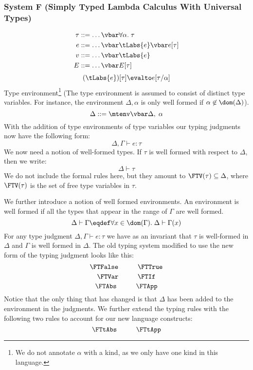 \subsubsection*{System F (Simply Typed Lambda Calculus With Universal Types)}
\begin{align*}
  \tau &::= \dots \vbar \forall \alpha. \; \tau \\
  e    &::= \dots \vbar \tLabs{e} \vbar e[\tau] \\
  v    &::= \dots \vbar \tLabs{e}\\
  E    &::= \dots \vbar E[\tau]
\end{align*}
\[
  (\tLabs{e})[\tau] \evalto e[\tau/\alpha]
\]
Type environment\footnote{We do not annotate $\alpha$ with a kind, as we only have one kind in this language.} (The type environment is assumed to consist of distinct type variables. For instance, the environment $\Delta,\alpha$ is only well formed if $\alpha \not\in \dom(\Delta)$).
\[
  \Delta ::= \mtenv \vbar \Delta,\; \alpha
\]
With the addition of type environments of type variables our typing judgments now have the following form:
\[
  \Delta,\Gamma \vdash e : \tau
\]
We now need a notion of well-formed types. If $\tau$ is well formed with respect to $\Delta$, then we write:
\[
  \Delta \vdash \tau
\]
We do not include the formal rules here, but they amount to $\FTV(\tau) \subseteq \Delta$, where $\FTV(\tau)$ is the set of free type variables in $\tau$.

We further introduce a notion of well formed environments. An environment is well formed if all the types that appear in the range of $\Gamma$ are well formed.
\[
  \Delta \vdash \Gamma \eqdef \forall x \in \dom(\Gamma). \; \Delta \vdash \Gamma(x)
\]
For any type judgment $\Delta,\Gamma \vdash e : \tau$ we have as an invariant that $\tau$ is well-formed in $\Delta$ and $\Gamma$ is well formed in $\Delta$. The old typing system modified to use the new form of the typing judgment looks like this:
\[
  \FTFalse
\hspace{1cm}
  \FTTrue
\]
\[
  \FTVar
\hspace{1cm}
  \FTIf
\]
\[
  \FTAbs
\hspace{1cm}
  \FTApp
\]
Notice that the only thing that has changed is that $\Delta$ has been added to the environment in the judgments. We further extend the typing rules with the following two rules to account for our new language constructs:
\[
  \FTtAbs
\hspace{1cm}
  \FTtApp
\]
